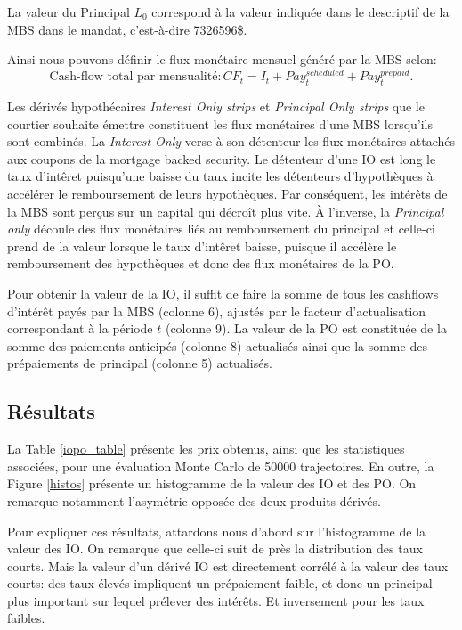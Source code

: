 La valeur du Principal
$L_0$ correspond à la valeur indiquée dans le descriptif de la MBS dans le mandat,
c'est-à-dire \num{7326596}\$.

Ainsi nous pouvons définir le flux monétaire mensuel généré par la MBS selon:
\[
\text{Cash-flow total par mensualité}: CF_t=I_t+Pay_t^{scheduled}+Pay_t^{prepaid}.
\]


Les dérivés hypothécaires \textit{Interest Only strips} et \textit{Principal Only strips}
que le courtier souhaite émettre constituent les flux monétaires d'une MBS lorsqu'ils sont
combinés. La \textit{Interest Only} verse à son détenteur les flux monétaires attachés aux
coupons de la mortgage backed security. Le détenteur d'une IO est long le taux d'intêret
puisqu'une baisse du taux incite les détenteurs d'hypothèques à accélérer le remboursement
de leurs hypothèques. Par conséquent, les intérêts de la MBS sont perçus sur un capital
qui décroît plus vite. À l'inverse, la \textit{Principal only} découle des flux monétaires
liés au remboursement du principal et celle-ci prend de la valeur lorsque le taux
d'intêret baisse, puisque il accélère le remboursement des hypothèques et donc des flux
monétaires de la PO.

\small
\begin{table}
  \centering
  \caption{}
  \label{mbs_table}
  \makebox[\textwidth]{}
\end{table}
\normalsize

Pour obtenir la valeur de la IO, il suffit de faire la somme de tous les cashflows
d'intérêt payés par la MBS (colonne 6), ajustés par le facteur d'actualisation
correspondant à la période $t$ (colonne 9). La valeur de la PO est constituée de la somme
des paiements anticipés (colonne 8) actualisés ainsi que la somme des prépaiements de
principal (colonne 5) actualisés.



\subsection*{Résultats}
La Table \ref{iopo_table} présente les prix obtenus, ainsi que les statistiques associées,
pour une évaluation Monte Carlo de \num{50000} trajectoires. En outre, la Figure
\ref{histos} présente un histogramme de la valeur des IO et des PO. On remarque notamment
l'asymétrie opposée des deux produits dérivés.

Pour expliquer ces résultats, attardons nous d'abord sur l'histogramme de la valeur des
IO. On remarque que celle-ci suit de près la distribution des taux courts. Mais la valeur
d'un dérivé IO est directement corrélé à la valeur des taux courts: des taux élevés
impliquent un prépaiement faible, et donc un principal plus important sur lequel prélever
des intérêts. Et inversement pour les taux faibles.

